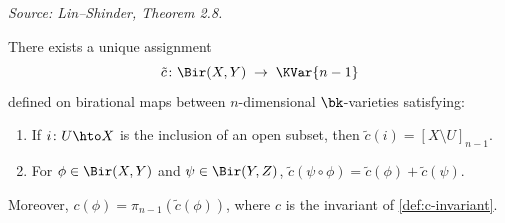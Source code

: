 \begin{theorem}
  \label{thm:def-c}
  \textit{Source: Lin--Shinder, Theorem 2.8.}

  There exists a unique assignment
  \[
    \tilde{c} \colon \Bir(X, Y) \;\to\; \KVar{n-1}
  \]
  defined on birational maps between \(n\)-dimensional \(\bk\)-varieties satisfying:
  \begin{enumerate}
    \item[(i)] If \(i \colon U \hto X\) is the inclusion of an open subset, then
      \(\tilde{c}(i) = [X \setminus U]_{n-1}\).
    \item[(ii)] For \(\phi \in \Bir(X,Y)\) and \(\psi \in \Bir(Y,Z)\),
      \(\tilde{c}(\psi \circ \phi) = \tilde{c}(\phi) + \tilde{c}(\psi)\).
  \end{enumerate}
  Moreover, \(c(\phi) = \pi_{n-1}(\tilde{c}(\phi))\), where \(c\) is the invariant
  of \cref{def:c-invariant}.
\end{theorem}
